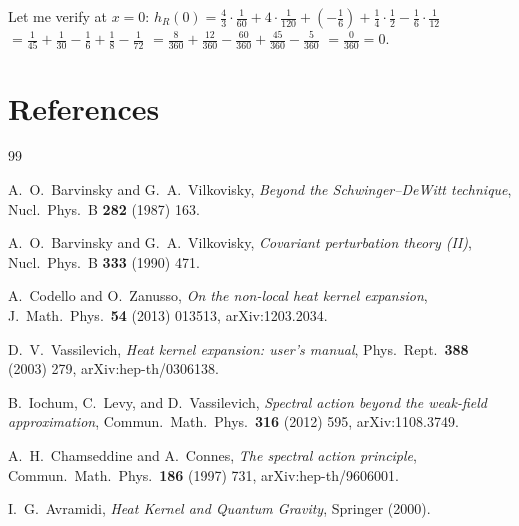 \documentclass[11pt,a4paper]{article}
\theoremstyle{definition}
\theoremstyle{remark}
\begin{document}
Let me verify at $x = 0$:
$h_R(0) = \frac{4}{3}\cdot\frac{1}{60} + 4\cdot\frac{1}{120}
+ (-\frac{1}{6}) + \frac{1}{4}\cdot\frac{1}{2}
- \frac{1}{6}\cdot\frac{1}{12}$
$= \frac{1}{45} + \frac{1}{30} - \frac{1}{6} + \frac{1}{8} - \frac{1}{72}$
$= \frac{8}{360} + \frac{12}{360} - \frac{60}{360} + \frac{45}{360} - \frac{5}{360}$
$= \frac{0}{360} = 0$. \checkmark


\newpage
\section*{References}

\begin{thebibliography}{99}

  A.~O.~Barvinsky and G.~A.~Vilkovisky,
  \emph{Beyond the Schwinger--DeWitt technique},
  Nucl.\ Phys.\ B \textbf{282} (1987) 163.

  A.~O.~Barvinsky and G.~A.~Vilkovisky,
  \emph{Covariant perturbation theory (II)},
  Nucl.\ Phys.\ B \textbf{333} (1990) 471.

  A.~Codello and O.~Zanusso,
  \emph{On the non-local heat kernel expansion},
  J.\ Math.\ Phys.\ \textbf{54} (2013) 013513,
  arXiv:1203.2034.

  D.~V.~Vassilevich,
  \emph{Heat kernel expansion: user's manual},
  Phys.\ Rept.\ \textbf{388} (2003) 279,
  arXiv:hep-th/0306138.

  B.~Iochum, C.~Levy, and D.~Vassilevich,
  \emph{Spectral action beyond the weak-field approximation},
  Commun.\ Math.\ Phys.\ \textbf{316} (2012) 595,
  arXiv:1108.3749.

  A.~H.~Chamseddine and A.~Connes,
  \emph{The spectral action principle},
  Commun.\ Math.\ Phys.\ \textbf{186} (1997) 731,
  arXiv:hep-th/9606001.

  I.~G.~Avramidi,
  \emph{Heat Kernel and Quantum Gravity},
  Springer (2000).

\end{thebibliography}
\end{document}
